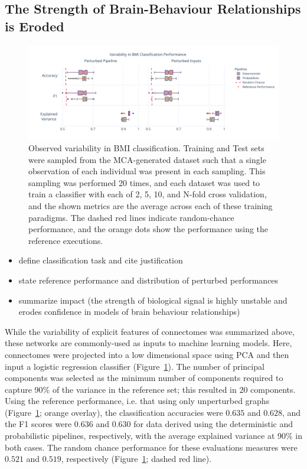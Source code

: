 \documentclass[fleqn,10pt]{SelfArx} %
\begin{document}
\subsection*{The Strength of Brain-Behaviour Relationships is Eroded}

\begin{figure}[ht]\centering
\includegraphics[width=\linewidth]{figures/fig3_bmi_classification.pdf}
\caption{Observed variability in BMI classification. Training and Test sets were sampled from the MCA-generated dataset
such that a single observation of each individual was present in each sampling. This sampling was performed 20 times,
and each dataset was used to train a classifier with each of 2, 5, 10, and N-fold cross validation, and the shown
metrics are the average across each of these training paradigms. The dashed red lines indicate random-chance
performance, and the orange dots show the performance using the reference executions.}
\label{fig:bmi}
\end{figure}

\begin{itemize}
\item define classification task and cite justification
\item state reference performance and distribution of perturbed performances
\item summarize impact (the strength of biological signal is highly unstable and erodes confidence in models of brain
behaviour relationships)
\end{itemize}

While the variability of explicit features of connectomes was summarized above, these networks are commonly-used as
inputs to machine learning models. Here, connectomes were projected into a low dimensional space using PCA and then
input a logistic regression classifier (Figure~\ref{fig:bmi}). The number of principal components was selected as the
minimum number of components required to capture 90\% of the variance in the reference set; this resulted in $20$
components. Using the reference performance, i.e. that using only unperturbed graphs (Figure~\ref{fig:bmi}; orange
overlay), the classification accuracies were $0.635$ and $0.628$, and the F1 scores were $0.636$ and $0.630$ for data
derived using the deterministic and probabilistic pipelines, respectively, with the average explained variance at 90\%
in both cases. The random chance performance for these evaluations measures were $0.521$ and $0.519$, respectively
(Figure~\ref{fig:bmi}; dashed red line).
\end{document}
